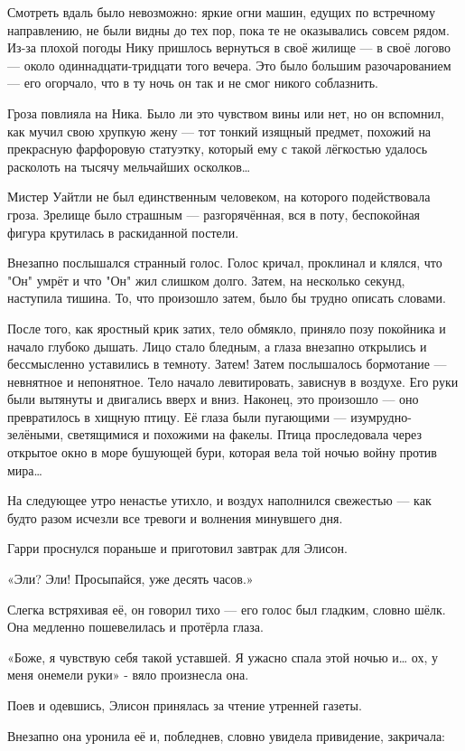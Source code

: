 \documentclass[a5paper, 9pt,
final, openany, twoside=true]{memoir}
\begin{document}
Смотреть вдаль было невозможно: яркие огни машин, едущих по встречному направлению, не были видны до тех пор, пока те не оказывались совсем рядом. Из-за плохой погоды Нику пришлось вернуться в своё жилище — в своё логово — около одиннадцати-тридцати того вечера. Это было большим разочарованием — его огорчало, что в ту ночь он так и не смог никого соблазнить.

Гроза повлияла на Ника. Было ли это чувством вины или нет, но он вспомнил, как мучил свою хрупкую жену — тот тонкий изящный предмет, похожий на прекрасную фарфоровую статуэтку, который ему с такой лёгкостью удалось расколоть на тысячу мельчайших осколков…\bigskip

Мистер Уайтли не был единственным человеком, на которого подействовала гроза. Зрелище было страшным — разгорячённая, вся в поту, беспокойная фигура крутилась в раскиданной постели.

Внезапно послышался странный голос. Голос кричал, проклинал и клялся, что "Он" умрёт и что "Он" жил слишком долго. Затем, на несколько секунд, наступила тишина. То, что произошло затем, было бы трудно описать словами.

После того, как яростный крик затих, тело обмякло, приняло позу покойника и начало глубоко дышать. Лицо стало бледным, а глаза внезапно открылись и бессмысленно уставились в темноту. Затем! Затем послышалось бормотание — невнятное и непонятное. Тело начало левитировать, зависнув в воздухе. Его руки были вытянуты и двигались вверх и вниз. Наконец, это произошло — оно превратилось в хищную птицу. Её глаза были пугающими — изумрудно-зелёными, светящимися и похожими на факелы. Птица проследовала через открытое окно в море бушующей бури, которая вела той ночью войну против мира…\bigskip

На следующее утро ненастье утихло, и воздух наполнился свежестью — как будто разом исчезли все тревоги и волнения минувшего дня.

Гарри проснулся пораньше и приготовил завтрак для Элисон.\bigskip

«Эли? Эли! Просыпайся, уже десять часов.»

Слегка встряхивая её, он говорил тихо — его голос был гладким, словно шёлк. Она медленно пошевелилась и протёрла глаза.

«Боже, я чувствую себя такой уставшей. Я ужасно спала этой ночью и… ох, у меня онемели руки» - вяло произнесла она.

Поев и одевшись, Элисон принялась за чтение утренней газеты.

Внезапно она уронила её и, побледнев, словно увидела привидение, закричала:
\end{document}
